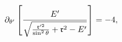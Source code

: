 \begin{equation}
\partial _{\theta ^{\prime }}\left[ \frac{E^{\prime }}{\sqrt{\frac{\frak{r}%
^{\prime 2}}{\sin ^{2}\theta }+\frak{r}^{2}-E^{\prime }}}\right] =-4,
\label{eqmvt}
\end{equation}

